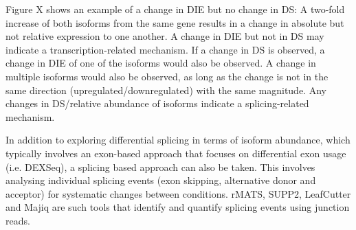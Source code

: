 Figure X shows an example of a change in DIE but no change in DS: A two-fold increase of both isoforms from the same gene results in a change in absolute but not relative expression to one another. A change in DIE but not in DS may indicate a transcription-related mechanism. If a change in DS is observed, a change in DIE of one of the isoforms would also be observed. A change in multiple isoforms would also be observed, as long as the change is not in the same direction (upregulated/downregulated) with the same magnitude. Any changes in DS/relative abundance of isoforms indicate a splicing-related mechanism. 

In addition to exploring differential splicing in terms of isoform abundance, which typically involves an exon-based approach that focuses on differential exon usage (i.e. DEXSeq), a splicing based approach can also be taken. This involves analysing individual splicing events (exon skipping, alternative donor and acceptor) for systematic changes between conditions. rMATS, SUPP2, LeafCutter and Majiq are such tools that identify and quantify splicing events using junction reads. 

